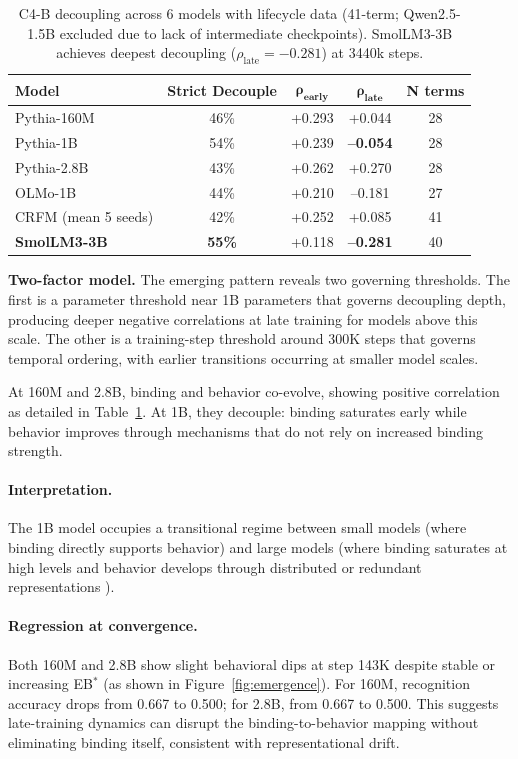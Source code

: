 \documentclass[10pt]{article} %
\begin{document}
\begin{table}[h]
\centering
\small
\begin{tabular}{|l|c|c|c|c|}
\hline
\textbf{Model} & \textbf{Strict Decouple} & $\mathbf{\rho_\text{early}}$ & $\mathbf{\rho_\text{late}}$ & \textbf{N terms} \\
\hline
Pythia-160M & 46\% & +0.293 & +0.044 & 28 \\
Pythia-1B & 54\% & +0.239 & \textbf{--0.054} & 28 \\
Pythia-2.8B & 43\% & +0.262 & +0.270 & 28 \\
OLMo-1B & 44\% & +0.210 & --0.181 & 27 \\
CRFM (mean 5 seeds) & 42\% & +0.252 & +0.085 & 41 \\
\textbf{SmolLM3-3B} & \textbf{55\%} & +0.118 & \textbf{--0.281} & 40 \\
\hline
\end{tabular}
\caption{C4-B decoupling across 6 models with lifecycle data (41-term; Qwen2.5-1.5B excluded due to lack of intermediate checkpoints). SmolLM3-3B achieves deepest decoupling ($\rho_\text{late}=-0.281$) at 3440k steps.}
\label{tab:c4b_decoupling}
\end{table}

\textbf{Two-factor model.}
The emerging pattern reveals two governing thresholds. The first is a parameter threshold near 1B parameters that governs decoupling depth, producing deeper negative correlations at late training for models above this scale. The other is a training-step threshold around 300K steps that governs temporal ordering, with earlier transitions occurring at smaller model scales.

At 160M and 2.8B, binding and behavior co-evolve, showing positive correlation as detailed in Table~\ref{tab:c4b_decoupling}.
At 1B, they decouple: binding saturates early while behavior improves through mechanisms that do not rely on increased binding strength.

\paragraph{Interpretation.}
The 1B model occupies a transitional regime \citep{kaplan2020scaling} between small models (where binding directly supports behavior) and large models (where binding saturates at high levels and behavior develops through distributed or redundant representations \citep{hinton1986distributed}).

\paragraph{Regression at convergence.}
Both 160M and 2.8B show slight behavioral dips at step 143K despite stable or increasing EB$^*$ (as shown in Figure~\ref{fig:emergence}).
For 160M, recognition accuracy drops from 0.667 to 0.500; for 2.8B, from 0.667 to 0.500.
This suggests late-training dynamics can disrupt the binding-to-behavior mapping without eliminating binding itself, consistent with representational drift.
\end{document}
